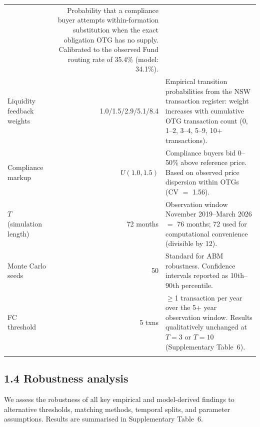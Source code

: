 \documentclass[pdflatex,sn-nature,oneside]{sn-jnl}
\begin{document}
\begin{table}[h]
\begin{tabular}{@{}p{4.8cm}rp{7.0cm}@{}}
  & Probability that a compliance buyer attempts within-formation
    substitution when the exact obligation OTG has no supply.
    Calibrated to the observed Fund routing rate of 35.4\%
    (model: 34.1\%). \\[4pt]
Liquidity feedback weights & 1.0/1.5/2.9/5.1/8.4
  & Empirical transition probabilities from the NSW transaction register:
    weight increases with cumulative OTG transaction count
    (0, 1--2, 3--4, 5--9, 10+ transactions). \\[4pt]
Compliance markup & $U(1.0, 1.5)$
  & Compliance buyers bid 0--50\% above reference price.
    Based on observed price dispersion within OTGs (CV $=$ 1.56). \\[4pt]
$T$ (simulation length) & 72 months
  & Observation window November 2019--March 2026 $=$ 76 months;
    72 used for computational convenience (divisible by 12). \\[4pt]
Monte Carlo seeds & 50
  & Standard for ABM robustness. Confidence intervals reported as
    10th--90th percentile. \\[4pt]
FC threshold & 5 txns
  & $\geq$1 transaction per year over the 5+ year observation window.
    Results qualitatively unchanged at $T = 3$ or $T = 10$
    (Supplementary Table~6). \\
\botrule
\end{tabular}
\end{table}


\subsection*{1.4 Robustness analysis}

We assess the robustness of all key empirical and model-derived findings to alternative thresholds, matching methods, temporal splits, and parameter assumptions. Results are summarised in Supplementary Table~6.
\end{document}
